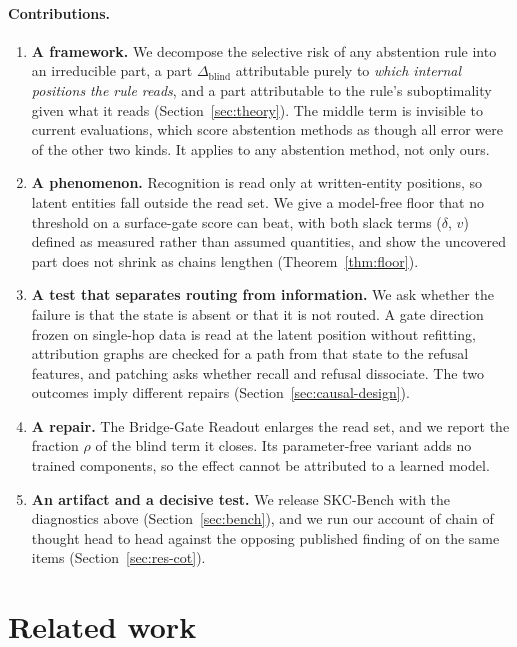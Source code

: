 \documentclass{article}
\begin{document}
\paragraph{Contributions.}
\begin{enumerate}
\itemsep0em
\item \textbf{A framework.} We decompose the selective risk of any abstention rule into an
irreducible part, a part $\Delta_{\mathrm{blind}}$ attributable purely to \emph{which internal
positions the rule reads}, and a part attributable to the rule's suboptimality given what it reads
(Section~\ref{sec:theory}). The middle term is invisible to current evaluations, which score
abstention methods as though all error were of the other two kinds. It applies to any abstention
method, not only ours.
\item \textbf{A phenomenon.} Recognition is read only at written-entity positions, so latent entities
fall outside the read set. We give a model-free floor that no threshold on a surface-gate score can
beat, with both slack terms ($\delta$, $v$) defined as measured rather than assumed quantities, and
show the uncovered part does not shrink as chains lengthen (Theorem~\ref{thm:floor}).
\item \textbf{A test that separates routing from information.} We ask whether the failure is that the
state is absent or that it is not routed. A gate direction frozen on single-hop data is read at the
latent position without refitting, attribution graphs are checked for a path from that state to the
refusal features, and patching asks whether recall and refusal dissociate. The two outcomes imply
different repairs (Section~\ref{sec:causal-design}).
\item \textbf{A repair.} The Bridge-Gate Readout enlarges the read set, and we report the fraction
$\rho$ of the blind term it closes. Its parameter-free variant adds no trained
components, so the effect cannot be attributed to a learned model.
\item \textbf{An artifact and a decisive test.} We release SKC-Bench with the diagnostics above
(Section~\ref{sec:bench}), and we run our account of chain of thought head to head against the
opposing published finding of \citet{cheng2025cotobscures} on the same items
(Section~\ref{sec:res-cot}).
\end{enumerate}

\section{Related work}
\end{document}
